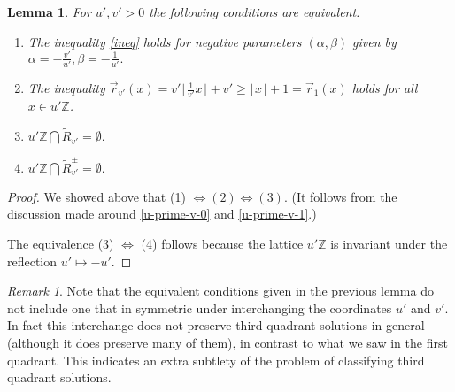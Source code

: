 \documentclass[12pt,letterpaper, reqno]{amsart}
\newtheorem{lem}[thm]{Lemma}
\theoremstyle{definition}
\theoremstyle{remark}
\newtheorem{rmk}[thm]{Remark}
\newcommand{\ZZ}{\ensuremath{\mathbb{Z}}}
\newcommand{\uu}{{u'}}
\newcommand{\vv}{{v'}}
\newcommand{\R}{{R}}
\newcommand{\floor}[1]{\lfloor{#1}\rfloor}
\newcommand{\tround}{\vec{r}}
\begin{document}
\begin{lem}\label{lem:52}
For $\uu, \vv>0$  the following conditions are equivalent.

\begin{enumerate}
\item[(1)] The inequality \eqref{ineq} holds for negative parameters $(\alpha, \beta)$ 
given by $\alpha= -\frac{\vv}{\uu}, \beta= -\frac{1}{\uu}.$ 
\item[(2)]  The inequality 
$\tround_{\vv}( x)  = \vv\floor{\frac{1}{\vv}x} + \vv \ge \floor{x}+1 = \tround_{1} (x)$ holds for all $x \in {\uu}\ZZ$.
\item[(3)] 
$\uu\ZZ \bigcap \widetilde{\R}_\vv = \emptyset.$
\item[(4)] 
${\uu} \ZZ \bigcap \widetilde{\R}_\vv^{\pm} = \emptyset.$
\end{enumerate}
\end{lem}

\begin{proof}
We showed above  that (1) $\Leftrightarrow (2) \Leftrightarrow (3)$. 
(It follows from  the discussion made around  \eqref{u-prime-v-0} and \eqref{u-prime-v-1}.)

The equivalence (3) $\Leftrightarrow$ (4) follows because the lattice $\uu \ZZ$
is invariant under the reflection $\uu \mapsto -\uu$.
\end{proof}

\begin{rmk}
Note that the equivalent conditions given in the previous lemma do not include one that in symmetric under interchanging the coordinates $\uu$ and $\vv$. In fact this interchange does not preserve third-quadrant solutions in general (although it does preserve many of them), in contrast to what we saw in the first quadrant. This indicates an extra subtlety of the problem of classifying third quadrant solutions.
\end{rmk}
\end{document}
